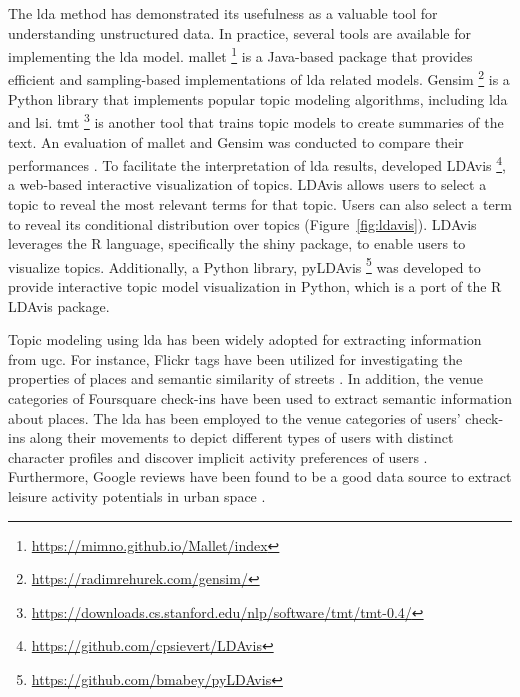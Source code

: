 \documentclass{article}
\theoremstyle{remark}
\begin{document}
The \acrshort{lda} method has demonstrated its usefulness as a valuable tool for understanding unstructured data. In practice, several tools are available for implementing the \acrshort{lda} model. \acrfull{mallet} \footnote{\url{https://mimno.github.io/Mallet/index}} is a Java-based package that provides efficient and sampling-based implementations of \acrshort{lda} related models. Gensim \footnote{\url{https://radimrehurek.com/gensim/}} is a Python library that implements popular topic modeling algorithms, including \acrshort{lda} and \acrshort{lsi}. \acrfull{tmt} \footnote{\url{https://downloads.cs.stanford.edu/nlp/software/tmt/tmt-0.4/}} is another tool that trains topic models to create summaries of the text. An evaluation of \acrshort{mallet} and Gensim was conducted to compare their performances \citep{ebeid_mallet_2016}. To facilitate the interpretation of \acrshort{lda} results, \cite{sievert_ldavis_2014} developed LDAvis \footnote{\url{https://github.com/cpsievert/LDAvis}}, a web-based interactive visualization of topics. LDAvis allows users to select a topic to reveal the most relevant terms for that topic. Users can also select a term to reveal its conditional distribution over topics (Figure~\ref{fig:ldavis}). LDAvis leverages the R language, specifically the shiny package, to enable users to visualize topics. Additionally, a Python library, pyLDAvis \footnote{\url{https://github.com/bmabey/pyLDAvis}} was developed to provide interactive topic model visualization in Python, which is a port of the R LDAvis package.

Topic modeling using \acrshort{lda} has been widely adopted for extracting information from \acrshort{ugc}. For instance, Flickr tags have been utilized for investigating the properties of places and semantic similarity of streets \citep{bahrehdar_description_2018, bahrehdar_streets_2020}. In addition, the venue categories of Foursquare check-ins have been used to extract semantic information about places. The \acrshort{lda} has been employed to the venue categories of users' check-ins along their movements to depict different types of users with distinct character profiles \citep{ferreira_uncovering_2020} and discover implicit activity preferences of users \citep{vu_discovering_2019}. Furthermore, Google reviews have been found to be a good data source to extract leisure activity potentials in urban space \citep{van_weerdenburg_where_2019}.
\end{document}
